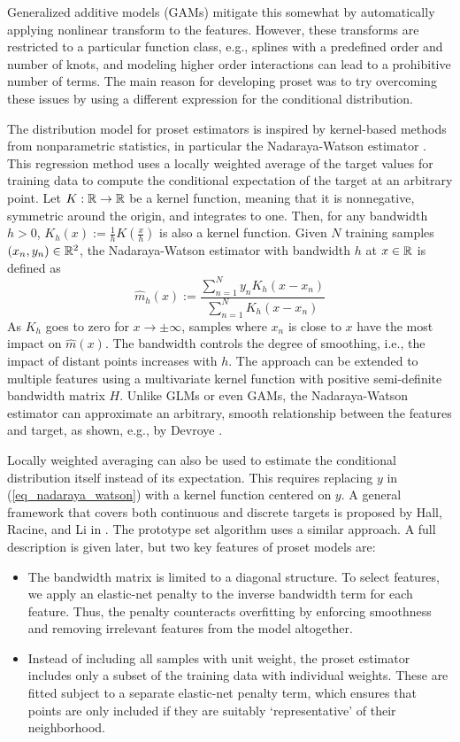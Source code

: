Generalized additive models (GAMs) mitigate this somewhat by automatically applying nonlinear transform to the features.
However, these transforms are restricted to a particular function class, e.g., splines with a predefined order and number of knots, and modeling higher order interactions can lead to a prohibitive number of terms.
The main reason for developing proset was to try overcoming these issues by using a different expression for the conditional distribution.\par
%
The distribution model for proset estimators is inspired by kernel-based methods from nonparametric statistics, in particular the Nadaraya-Watson estimator \cite{Nadaraya_64}\cite{Watson_64}.
This regression method uses a locally weighted average of the target values for training data to compute the conditional expectation of the target at an arbitrary point.
Let $K:\mathbb{R}\rightarrow\mathbb{R}$ be a kernel function, meaning that it is nonnegative, symmetric around the origin, and integrates to one.
Then, for any bandwidth $h>0$, $K_h(x):=\frac{1}{h}K\left(\frac{x}{h}\right)$ is also a kernel function.
Given $N$ training samples $(x_n, y_n)\in\mathbb{R}^2$, the Nadaraya-Watson estimator with bandwidth $h$ at $x\in\mathbb{R}$ is defined as
%
\begin{equation}
\hat{m}_h(x):=\frac{\sum_{n=1}^Ny_nK_h(x-x_n)}{\sum_{n=1}^NK_h(x-x_n)}\label{eq_nadaraya_watson}
\end{equation}
%
As $K_h$ goes to zero for $x\rightarrow\pm\infty$, samples where $x_n$ is close to $x$ have the most impact on $\hat{m}(x)$.
The bandwidth controls the degree of smoothing, i.e., the impact of distant points increases with $h$.
The approach can be extended to multiple features using a multivariate kernel function with positive semi-definite bandwidth matrix $H$.
Unlike GLMs or even GAMs, the Nadaraya-Watson estimator can approximate an arbitrary, smooth relationship between the features and target, as shown, e.g., by Devroye \cite{Devroye_78}.\par
%
Locally weighted averaging can also be used to estimate the conditional distribution itself instead of its expectation.
This requires replacing $y$ in (\ref{eq_nadaraya_watson}) with a kernel function centered on $y$.
A general framework that covers both continuous and discrete targets is proposed by Hall, Racine, and Li in \cite{Hall_04}.
The prototype set algorithm uses a similar approach.
A full description is given later, but two key features of proset models are:
%
\begin{itemize}
\item The bandwidth matrix is limited to a diagonal structure.
To select features, we apply an elastic-net penalty to the inverse bandwidth term for each feature.
Thus, the penalty counteracts overfitting by enforcing smoothness and removing irrelevant features from the model altogether.
%
\item Instead of including all samples with unit weight, the proset estimator includes only a subset of the training data with individual weights.
These are fitted subject to a separate elastic-net penalty term, which ensures that points are only included if they are suitably `representative' of their neighborhood.
\end{itemize}
